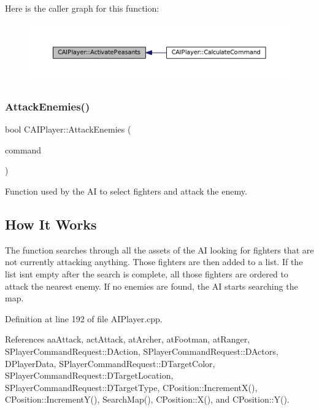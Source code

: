 Here is the caller graph for this function\+:\nopagebreak
\begin{figure}[H]
\begin{center}
\leavevmode
\includegraphics[width=350pt]{classCAIPlayer_a3fab1c955fd68bb53fa80bb1872d2819_icgraph}
\end{center}
\end{figure}
\hypertarget{classCAIPlayer_adf7feeba7debf9f19b000887616d7bfb}{}\label{classCAIPlayer_adf7feeba7debf9f19b000887616d7bfb} 
\subsubsection{\texorpdfstring{Attack\+Enemies()}{AttackEnemies()}}
{\footnotesize\ttfamily bool C\+A\+I\+Player\+::\+Attack\+Enemies (\begin{DoxyParamCaption}\item[{\hyperlink{structSPlayerCommandRequest}{S\+Player\+Command\+Request} \&}]{command }\end{DoxyParamCaption})\hspace{0.3cm}{\ttfamily [protected]}}



Function used by the AI to select fighters and attack the enemy. 

\hypertarget{classCAIPlayer_aehow_sec}{}\subsection{How It Works}\label{classCAIPlayer_aehow_sec}
The function searches through all the assets of the AI looking for fighters that are not currently attacking anything. Those fighters are then added to a list. If the list isn\textquotesingle{}t empty after the search is complete, all those fighters are ordered to attack the nearest enemy. If no enemies are found, the AI starts searching the map. 

Definition at line 192 of file A\+I\+Player.\+cpp.



References aa\+Attack, act\+Attack, at\+Archer, at\+Footman, at\+Ranger, S\+Player\+Command\+Request\+::\+D\+Action, S\+Player\+Command\+Request\+::\+D\+Actors, D\+Player\+Data, S\+Player\+Command\+Request\+::\+D\+Target\+Color, S\+Player\+Command\+Request\+::\+D\+Target\+Location, S\+Player\+Command\+Request\+::\+D\+Target\+Type, C\+Position\+::\+Increment\+X(), C\+Position\+::\+Increment\+Y(), Search\+Map(), C\+Position\+::\+X(), and C\+Position\+::\+Y().



